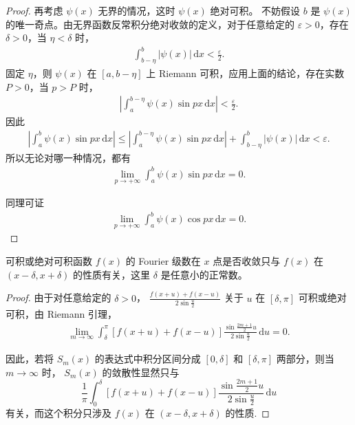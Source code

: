 \documentclass[../../main.tex]{subfiles}%
\begin{document}
\begin{proof}
再考虑 $\psi(x)$ 无界的情况，这时 $\psi(x)$ 绝对可积。
不妨假设 $b$ 是 $\psi(x)$ 的唯一奇点。由无界函数反常积分绝对收敛的定义，对于任意给定的 $\varepsilon > 0$，存在 $\delta > 0$，当 $\eta < \delta$ 时，
\begin{align*}
\int_{b-\eta}^{b} |\psi(x)| \,\mathrm{d}x < \frac{\varepsilon}{2}.
\end{align*}
固定 $\eta$，则 $\psi(x)$ 在 $[a, b-\eta]$ 上 Riemann 可积，应用上面的结论，存在实数 $P>0$，当 $p>P$ 时，
\begin{align*}
\left| \int_a^{b-\eta} \psi(x) \sin p x \,\mathrm{d}x \right| < \frac{\varepsilon}{2}.
\end{align*}
因此
\begin{align*}
\left| \int_a^b \psi(x) \sin p x \,\mathrm{d}x \right|
\leqslant \left| \int_a^{b-\eta} \psi(x) \sin p x \,\mathrm{d}x \right| + \int_{b-\eta}^b |\psi(x)| \,\mathrm{d}x 
< \varepsilon.
\end{align*}
所以无论对哪一种情况，都有
\begin{align*}
\lim_{p \to +\infty} \int_a^b \psi(x) \sin p x \,\mathrm{d}x = 0.
\end{align*}

同理可证
\begin{align*}
\lim_{p \to +\infty} \int_a^b \psi(x) \cos p x \,\mathrm{d}x = 0.
\end{align*}
\end{proof}

\begin{corollary}[局部性原理]
可积或绝对可积函数 $f(x)$ 的 Fourier 级数在 $x$ 点是否收敛只与 $f(x)$ 在 $(x-\delta, x+\delta)$ 的性质有关，这里 $\delta$ 是任意小的正常数。
\end{corollary}
\begin{proof}
由于对任意给定的 $\delta > 0$，
$\frac{f(x+u) + f(x-u)}{2\sin \frac{u}{2}}$
关于 $u$ 在 $[\delta, \pi]$ 可积或绝对可积，由 Riemann 引理，
\begin{align*}
\lim_{m \to \infty} \int_{\delta}^\pi [f(x+u) + f(x-u)] \frac{\sin \frac{2m+1}{2}u}{2\sin \frac{u}{2}} \,\mathrm{d}u = 0.
\end{align*}

因此，若将 $S_m(x)$ 的表达式中积分区间分成 $[0, \delta]$ 和 $[\delta, \pi]$ 两部分，则当 $m \to \infty$ 时，
$S_m(x)$ 的敛散性显然只与
$$\frac{1}{\pi} \int_0^\delta [f(x+u) + f(x-u)] \frac{\sin \frac{2m+1}{2}u}{2\sin \frac{u}{2}} \,\mathrm{d}u$$
有关，而这个积分只涉及 $f(x)$ 在 $(x-\delta, x+\delta)$ 的性质.
\end{proof}
\end{document}
